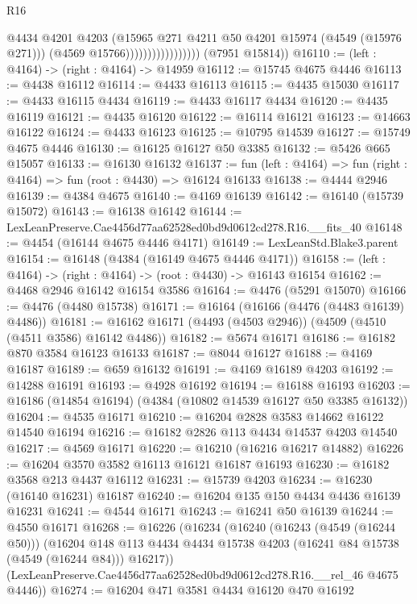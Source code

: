 \begin{lexlean}{R16}
\begin{coremodule}
                                      @4434
                                      @4201
                                      @4203
                                      (@15965 @271 @4211 @50 @4201 @15974 (@4549 (@15976 @271)))
                                      (@4569 @15766)))))))))))))))))
      (@7951 @15814))
@16110 := (left : @4164) -> (right : @4164) -> @14959
@16112 := @15745 @4675 @4446
@16113 := @4438 @16112
@16114 := @4433 @16113
@16115 := @4435 @15030
@16117 := @4433 @16115 @4434
@16119 := @4433 @16117 @4434
@16120 := @4435 @16119
@16121 := @4435 @16120
@16122 := @16114 @16121
@16123 := @14663 @16122
@16124 := @4433 @16123
@16125 := @10795 @14539
@16127 := @15749 @4675 @4446
@16130 := @16125 @16127 @50 @3385
@16132 := @5426 @665 @15057
@16133 := @16130 @16132
@16137 := fun (left : @4164) => fun (right : @4164) => fun (root : @4430) => @16124 @16133
@16138 := @4444 @2946
@16139 := @4384 @4675
@16140 := @4169 @16139
@16142 := @16140 (@15739 @15072)
@16143 := @16138 @16142
@16144 := LexLeanPreserve.Cae4456d77aa62528ed0bd9d0612cd278.R16.__fits_40
@16148 := @4454 (@16144 @4675 @4446 @4171)
@16149 := LexLeanStd.Blake3.parent
@16154 := @16148 (@4384 (@16149 @4675 @4446 @4171))
@16158 := (left : @4164) -> (right : @4164) -> (root : @4430) -> @16143 @16154
@16162 := @4468 @2946 @16142 @16154 @3586
@16164 := @4476 (@5291 @15070)
@16166 := @4476 (@4480 @15738)
@16171 := @16164 (@16166 (@4476 (@4483 @16139) @4486))
@16181 := @16162 @16171 (@4493 (@4503 @2946)) (@4509 (@4510 (@4511 @3586) @16142 @4486))
@16182 := @5674 @16171
@16186 := @16182 @870 @3584 @16123 @16133
@16187 := @8044 @16127
@16188 := @4169 @16187
@16189 := @659 @16132
@16191 := @4169 @16189 @4203
@16192 := @14288 @16191
@16193 := @4928 @16192
@16194 := @16188 @16193
@16203 := @16186 (@14854 @16194) (@4384 (@10802 @14539 @16127 @50 @3385 @16132))
@16204 := @4535 @16171
@16210 := @16204 @2828 @3583 @14662 @16122 @14540 @16194
@16216 := @16182 @2826 @113 @4434 @14537 @4203 @14540
@16217 := @4569 @16171
@16220 := @16210 (@16216 @16217 @14882)
@16226 := @16204 @3570 @3582 @16113 @16121 @16187 @16193
@16230 := @16182 @3568 @213 @4437 @16112
@16231 := @15739 @4203
@16234 := @16230 (@16140 @16231) @16187
@16240 := @16204 @135 @150 @4434 @4436 @16139 @16231
@16241 := @4544 @16171
@16243 := @16241 @50 @16139
@16244 := @4550 @16171
@16268 := @16226
    (@16234
      (@16240
        (@16243 (@4549 (@16244 @50)))
        (@16204 @148 @113 @4434 @4434 @15738 @4203 (@16241 @84 @15738 (@4549 (@16244 @84))) @16217))
      (LexLeanPreserve.Cae4456d77aa62528ed0bd9d0612cd278.R16.__rel_46 @4675 @4446))
@16274 := @16204 @471 @3581 @4434 @16120 @470 @16192

\end{coremodule}
\end{lexlean}
